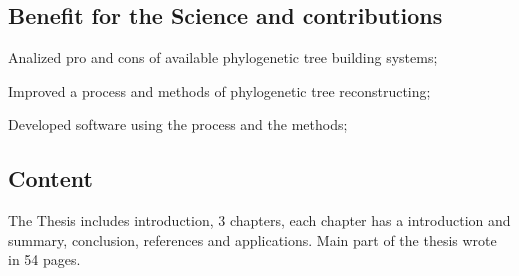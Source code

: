 \subsection*{Benefit for the Science and contributions}
Analized pro and cons of available phylogenetic tree building systems;

Improved a process and methods of phylogenetic tree reconstructing;

Developed software using the process and the methods;

\subsection*{Content}
The Thesis includes introduction, 3 chapters, 
each chapter has a introduction and summary, 
conclusion, references and applications. 
Main part of the thesis wrote in 54 pages.

% 
% 

